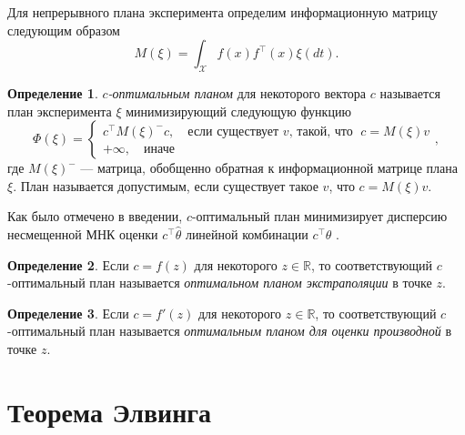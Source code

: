 \documentclass[specialist,
               substylefile = spbu.rtx,
               subf,href,colorlinks=true, 12pt]{disser}
\theoremstyle{definition}
\newtheorem{definition}{Определение}
\begin{document}
  Для непрерывного плана эксперимента определим информационную матрицу следующим образом
  \begin{equation*}
    M(\xi) = \int_{\mathcal{X}} f(x) f^\top(x) \xi (dt).
  \end{equation*}
  
  \begin{definition}
  \label{def:coptim}
  \textit{$c$-оптимальным планом} для некоторого вектора $c$ называется план эксперимента $\xi$ минимизирующий следующую функцию
  \begin{equation*}
    \Phi(\xi) = \begin{cases}
      c^\top M(\xi)^{-} c, \quad \text{если существует } v \text{, такой, что } \; c = M(\xi) v\\
      +\infty, \quad  \text{иначе}
    \end{cases},
  \end{equation*}
  где $M(\xi)^{-}$ --- матрица, обобщенно обратная к информационной матрице плана $\xi$.
  План называется допустимым, если существует такое $v$, что $c = M(\xi) v$.
  \end{definition}
  
  Как было отмечено в введении, $c$-оптимальный план минимизирует дисперсию несмещенной МНК оценки $c^\top \hat{\theta}$ линейной комбинации $c^\top \theta$ \cite{dette1993_2}.
  
  \begin{definition}
  Если $c = f(z)$ для некоторого $z \in \mathbb{R}$, то соответствующий $c$-оптимальный план называется \textit{оптимальном планом экстраполяции} в точке $z$.
  \end{definition}
  
  \begin{definition}
  Если $c = f'(z)$ для некоторого $z \in \mathbb{R}$, то соответствующий $c$-оптимальный план называется \textit{оптимальным планом для оценки производной} в точке $z$.
  \end{definition}
  
  \section{Теорема Элвинга}
  
\end{document}
